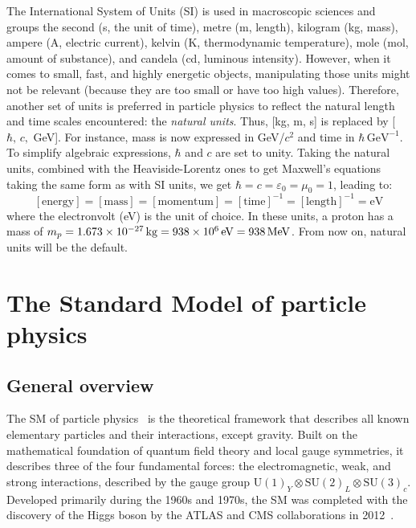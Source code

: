 The International System of Units (SI) is used in macroscopic sciences and groups the second (s, the unit of time), metre (m, length), kilogram (kg, mass), ampere (A, electric current), kelvin (K, thermodynamic temperature), mole (mol, amount of substance), and candela (cd, luminous intensity). However, when it comes to small, fast, and highly energetic objects, manipulating those units might not be relevant (because they are too small or have too high values). Therefore, another set of units is preferred in particle physics to reflect the natural length and time scales encountered: the \textit{natural units}. Thus, [kg, m, s] is replaced by [$\hbar,\,c,$ GeV]. For instance, mass is now expressed in GeV/$c^2$ and time in $\hbar\,\mathrm{GeV}^{-1}$. To simplify algebraic expressions, $\hbar$ and $c$ are set to unity. Taking the natural units, combined with the Heaviside-Lorentz ones to get Maxwell's equations taking the same form as with SI units, we get $\hbar=c=\varepsilon_0=\mu_0=1$, leading to:
\begin{equation*}
    \mathrm{[energy]=[mass]=[momentum]=[time]^{-1}=[length]^{-1}=eV}
\end{equation*}
where the electronvolt (eV) is the unit of choice. In these units, a proton has a mass of $m_p=1.673\times10^{-27}\,\mathrm{kg}=938\times10^6\,\rm eV = 938\,\mathrm{MeV}$. From now on, natural units will be the default. 


\section{The Standard Model of particle physics}
\label{sec:sm}

\subsection{General overview}

The SM of particle physics~\cite{Glashow1961, Weinberg1967, Salam1968} is the theoretical framework that describes all known elementary particles and their interactions, except gravity. Built on the mathematical foundation of quantum field theory and local gauge symmetries, it describes three of the four fundamental forces: the electromagnetic, weak, and strong interactions, described by the gauge group $\mathrm{U}(1)_Y \otimes \mathrm{SU}(2)_L \otimes\mathrm{SU}(3)_c$. Developed primarily during the 1960s and 1970s, the SM was completed with the discovery of the Higgs boson by the ATLAS and CMS
collaborations in 2012~\cite{ATLAS_Higgs, CMS_Higgs}.

